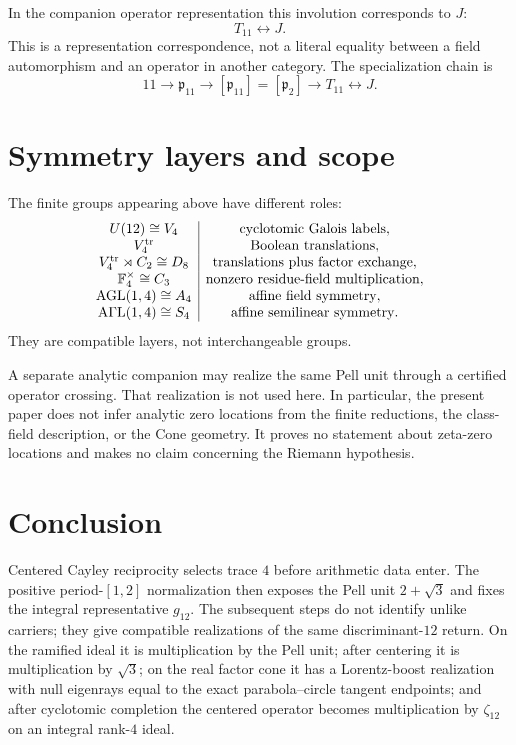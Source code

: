 \documentclass[11pt]{article}
\theoremstyle{remark}
\newcommand{\F}{\mathbb F}
\begin{document}
In the companion operator representation this involution corresponds to $J$:
\[
\boxed{T_{11}\longleftrightarrow J.}
\]
This is a representation correspondence, not a literal equality between a
field automorphism and an operator in another category.  The specialization
chain is
\[
\boxed{
11\longrightarrow\mathfrak p_{11}
\longrightarrow[\mathfrak p_{11}]=[\mathfrak p_2]
\longrightarrow T_{11}\longleftrightarrow J.}
\]

\section{Symmetry layers and scope}

The finite groups appearing above have different roles:
\[
\begin{array}{c|c}
U(12)\cong V_4 & \text{cyclotomic Galois labels},\\
V_4^{\rm tr} & \text{Boolean translations},\\
V_4^{\rm tr}\rtimes C_2\cong D_8 & \text{translations plus factor exchange},\\
\F_4^\times\cong C_3 & \text{nonzero residue-field multiplication},\\
\operatorname{AGL}(1,4)\cong A_4 & \text{affine field symmetry},\\
\operatorname{A\Gamma L}(1,4)\cong S_4 & \text{affine semilinear symmetry}.
\end{array}
\]
They are compatible layers, not interchangeable groups.

A separate analytic companion may realize the same Pell unit through a
certified operator crossing.  That realization is not used here.  In
particular, the present paper does not infer analytic zero locations from the
finite reductions, the class-field description, or the Cone geometry.  It
proves no statement about zeta-zero locations and makes no claim concerning
the Riemann hypothesis.

\section{Conclusion}

Centered Cayley reciprocity selects trace $4$ before arithmetic data enter.
The positive period-$[1,2]$ normalization then exposes the Pell unit
$2+\sqrt3$ and fixes the integral representative $g_{12}$.  The subsequent
steps do not identify unlike carriers; they give compatible realizations of
the same discriminant-$12$ return.  On the ramified ideal it is multiplication
by the Pell unit; after centering it is multiplication by $\sqrt3$; on the
real factor cone it has a Lorentz-boost realization with null eigenrays equal
to the exact parabola--circle tangent endpoints; and after cyclotomic
completion the centered operator becomes multiplication by $\zeta_{12}$ on an
integral rank-$4$ ideal.
\end{document}
